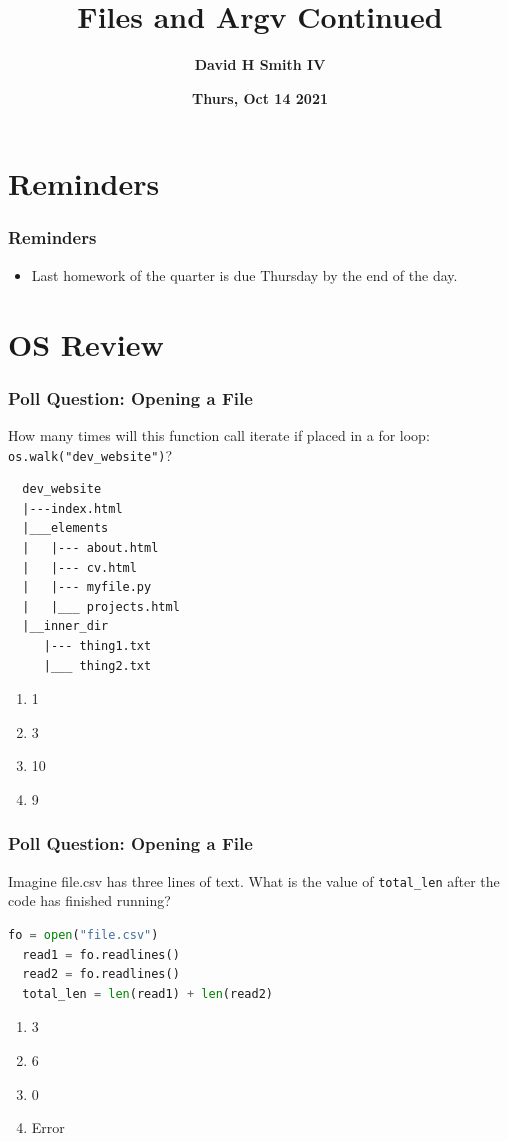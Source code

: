 \documentclass{beamer}
\title{\textbf{Files and Argv Continued}}
\author{\textbf{David H Smith IV}}
\institute[\textbf{UIUC}]{\textbf{University of Illinois Urbana-Champaign}}
\date{\textbf{Thurs, Oct 14 2021}}
\begin{document}
\frame{\titlepage}

\section{Reminders}

%
%
\begin{frame}
  \frametitle{Reminders}
  \begin{itemize}
    \item Last homework of the quarter is due Thursday by the end of the day.
  \end{itemize}
\end{frame}

\section{OS Review}

\begin{frame}[fragile]
  \frametitle{Poll Question: Opening a File}
  How many times will this function call iterate if placed in a for loop: \lstinline|os.walk("dev_website")|?
  \begin{minipage}{0.74\textwidth}
    \begin{lstlisting}
  dev_website
  |---index.html
  |___elements
  |   |--- about.html
  |   |--- cv.html
  |   |--- myfile.py
  |   |___ projects.html
  |__inner_dir
     |--- thing1.txt
     |___ thing2.txt
    \end{lstlisting} 
  \end{minipage}
  \begin{minipage}{0.24\textwidth}
    \begin{enumerate}[A]
      \item 1
      \item 3
      \item 10
      \item 9
    \end{enumerate}
  \end{minipage}
\end{frame}

%
%
\begin{frame}[fragile]
  \frametitle{Poll Question: Opening a File}
  Imagine file.csv has three lines of text. What is the value of \lstinline|total_len| after the code has finished running?
  \begin{lstlisting}[language=Python, autogobble]
  fo = open("file.csv")
  read1 = fo.readlines()
  read2 = fo.readlines()
  total_len = len(read1) + len(read2)
  \end{lstlisting} 
  \vfill
  \begin{enumerate}[A]
    \item 3
    \item 6
    \item 0
    \item Error
  \end{enumerate}
\end{frame}
\end{document}
